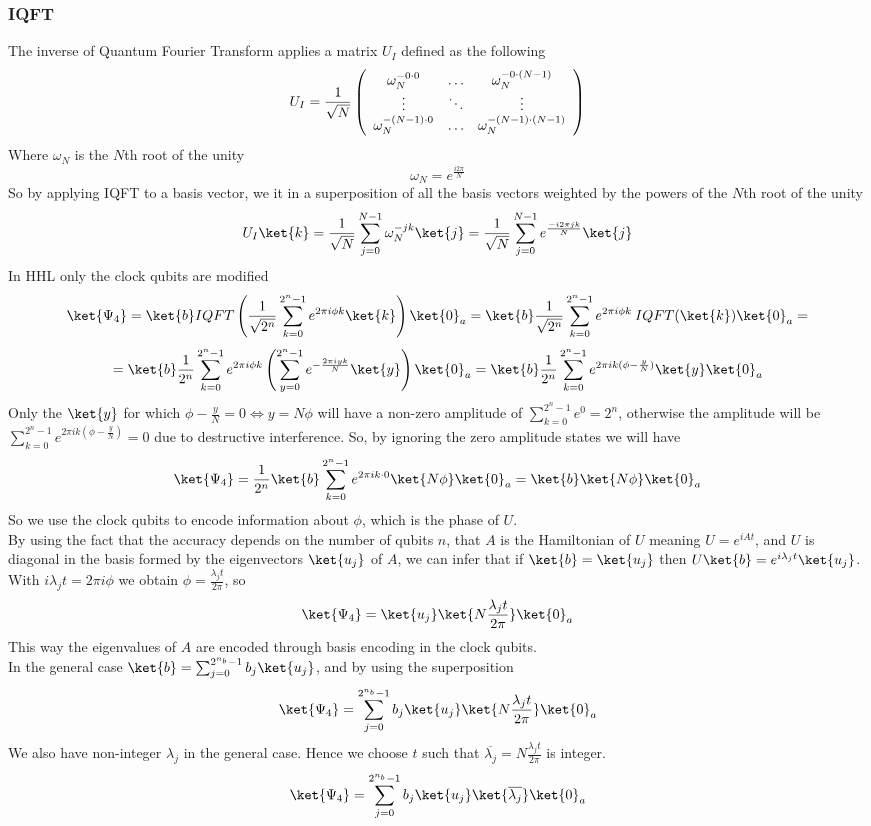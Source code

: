 \documentclass[10pt]{article}
\begin{document}
\subsubsection{IQFT}
The inverse of Quantum Fourier Transform applies a matrix $U_I$ defined as the following
$$U_I=\frac{1}{\sqrt{N}}\left(
	\begin{array}{c c c}
		\omega_N^{-0\cdot 0}&\ldots&\omega_N^{-0\cdot (N-1)}\\
		\vdots&\ddots&\vdots\\
		\omega_N^{-(N-1)\cdot 0}&\ldots&\omega_N^{-(N-1)\cdot(N-1)}
	\end{array}
\right)$$
Where $\omega_N$ is the $N$th root of the unity
$$\omega_N=e^{\frac{i2\pi}{N}}$$
So by applying IQFT to a basis vector, we it in a superposition of all the basis vectors weighted by the powers of the $N$th root of the unity
$$U_I\ket{k}=\frac{1}{\sqrt{N}}\sum_{j=0}^{N-1}\omega_N^{-jk}\ket{j} = \frac{1}{\sqrt{N}}\sum_{j=0}^{N-1}e^{\frac{-i2\pi jk}{N}}\ket{j}$$
In HHL only the clock qubits are modified
$$\ket{\Psi_4} = \ket{b}IQFT\left(\frac{1}{\sqrt{2^n}}\sum_{k=0}^{2^n-1}e^{2\pi i\phi k}\ket{k}\right)\ket{0}_a= \ket{b}\frac{1}{\sqrt{2^n}}\sum_{k=0}^{2^n-1}e^{2\pi i\phi k}\:IQFT(\ket{k})\ket{0}_a=$$
$$=\ket{b}\frac{1}{2^n}\sum_{k=0}^{2^n-1}e^{2\pi i\phi k}\left(\sum_{y=0}^{2^n-1} e^{-\frac{2\pi iyk}{N}}\ket{y}\right)\ket{0}_a =\ket{b}\frac{1}{2^n}\sum_{k=0}^{2^n-1}e^{2\pi ik(\phi-\frac{y}{N})}\ket{y}\ket{0}_a$$
Only the $\ket{y}$ for which $\phi - \frac{y}{N} = 0 \Leftrightarrow y = N\phi$ will have a non-zero amplitude of $\sum_{k=0}^{2^n-1}e^{0} = 2^n$, otherwise the amplitude will be $\sum_{k=0}^{2^n-1}e^{2\pi ik(\phi-\frac{y}{N})}=0$ due to destructive interference. So, by ignoring the zero amplitude states we will have
$$\ket{\Psi_4}=\frac{1}{2^n}\ket{b}\sum_{k=0}^{2^n-1}e^{2\pi ik\cdot 0}\ket{N\phi}\ket{0}_a = \ket{b}\ket{N\phi}\ket{0}_a$$
So we use the clock qubits to encode information about $\phi$, which is the phase of $U$.\\
By using the fact that the accuracy depends on the number of qubits $n$, that $A$ is the Hamiltonian of $U$ meaning $U = e^{iAt}$, and $U$ is diagonal in the basis formed by the eigenvectors $\ket{u_j}$ of $A$, we can infer that if $\ket{b}=\ket{u_j}$ then $U\ket{b}=e^{i\lambda_jt}\ket{u_j}$. With $i\lambda_jt=2\pi i\phi$ we obtain $\phi = \frac{\lambda_jt}{2\pi}$, so
$$\ket{\Psi_4}=\ket{u_j}\ket{N\frac{\lambda_jt}{2\pi}}\ket{0}_a$$
This way the eigenvalues of $A$ are encoded through basis encoding in the clock qubits.\\
In the general case $\ket{b} = \sum_{j=0}^{2^{n_b}-1}b_j\ket{u_j}$, and by using the superposition
$$\ket{\Psi_4}=\sum_{j=0}^{2^{n_b}-1}b_j\ket{u_j}\ket{N\frac{\lambda_jt}{2\pi}}\ket{0}_a$$
We also have non-integer $\lambda_j$ in the general case. Hence we choose $t$ such that $\overline{\lambda_j}=N\frac{\lambda_jt}{2\pi}$ is integer.
$$\ket{\Psi_4}=\sum_{j=0}^{2^{n_b}-1}b_j\ket{u_j}\ket{\overline{\lambda_j}}\ket{0}_a$$
\end{document}
